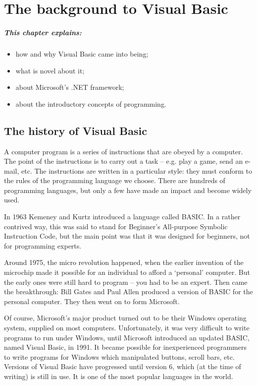 \chapter{The background to Visual Basic}                                                                                                                                                                                                                  
	\paragraph{This chapter explains:}
		\begin{itemize}
			\item	how and why Visual Basic came into being;
			\item	what is novel about it;
			\item	about Microsoft’s .NET framework;
			\item	about the introductory concepts of programming.
		\end{itemize}
	\section{The history of Visual Basic}
		A computer program is a series of instructions that are obeyed by a computer. The point of the instructions is to carry out a task – e.g. play a game, send an e-mail, etc. The instructions are written in a particular style: they must conform to the rules of the programming language we choose. There are hundreds of programming languages, but only a few have made an impact and become widely used.

		In 1963 Kemeney and Kurtz introduced a language called BASIC. In a rather contrived way, this was said to stand for Beginner’s All-purpose Symbolic Instruction Code, but the main point was that it was designed for beginners, not for programming experts.

		Around 1975, the micro revolution happened, when the earlier invention of the microchip made it possible for an individual to afford a ‘personal’ computer. But the early ones were still hard to program – you had to be an expert. Then came the breakthrough: Bill Gates and Paul Allen produced a version of BASIC for the personal computer. They then went on to form Microsoft.

		Of course, Microsoft’s major product turned out to be their Windows operating system, supplied on most computers. Unfortunately, it was very difficult to write programs to run under Windows, until Microsoft introduced an updated BASIC, named Visual Basic, in 1991. It became possible for inexperienced programmers to write programs for Windows which manipulated buttons, scroll bars, etc. Versions of Visual Basic have progressed until version 6, which (at the time of writing) is still in use. It is one of the most popular languages in the world.
		
